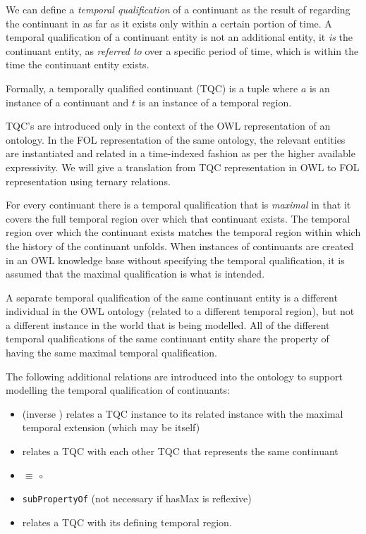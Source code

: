 
We can define a \emph{temporal qualification} of a
continuant as the result of regarding the continuant in as far as it exists only
within a certain portion of time. A temporal qualification of a continuant entity is
not an additional entity, it \emph{is} the continuant entity, as \emph{referred to}
over a specific period of time, which is within the time the continuant entity
exists.

Formally, a temporally qualified continuant (TQC) is a tuple 
where $a$ is an instance
of a continuant and $t$ is an instance of a temporal region.

TQC's are introduced only in the context of the OWL representation of
an ontology. In the FOL representation of the same ontology, the relevant
entities are instantiated and related in a time-indexed fashion
as per the higher available expressivity.
We will give a translation from TQC representation in OWL to
FOL representation using ternary relations.

For every continuant there is a temporal qualification that is \textit{maximal} in that it covers the full temporal region over which that continuant exists. The temporal region over which the continuant exists matches the temporal region within which the history of the continuant unfolds. When instances of continuants are created in an OWL knowledge base without specifying the temporal qualification, it is assumed that the maximal qualification is what is intended.

A separate temporal qualification of the same continuant entity is a different individual in the OWL ontology (related to a different temporal region), but not a different instance in the world that is being modelled. All of the different temporal qualifications of the same continuant entity share the property of having the same maximal temporal qualification.

The following additional relations are introduced into the ontology to support modelling the temporal qualification of continuants:
\begin{itemize}
    \item {} (inverse ) relates a TQC instance to its related instance with the maximal temporal extension (which may be itself)
    \item {} relates a TQC with each other TQC that represents the same continuant
    \item {} $\equiv$  $\circ$ 
    \item {} \texttt{subPropertyOf}  (not necessary if hasMax is reflexive)
    \item {} relates a TQC with its defining temporal region.
\end{itemize}

